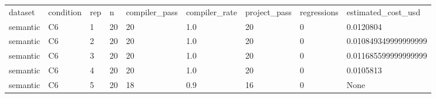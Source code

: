 \begin{tabular}{lllllllll}
dataset & condition & rep & n & compiler\_pass & compiler\_rate & project\_pass & regressions & estimated\_cost\_usd \\
semantic & C6 & 1 & 20 & 20 & 1.0 & 20 & 0 & 0.0120804 \\
semantic & C6 & 2 & 20 & 20 & 1.0 & 20 & 0 & 0.010849349999999999 \\
semantic & C6 & 3 & 20 & 20 & 1.0 & 20 & 0 & 0.011685599999999999 \\
semantic & C6 & 4 & 20 & 20 & 1.0 & 20 & 0 & 0.0105813 \\
semantic & C6 & 5 & 20 & 18 & 0.9 & 16 & 0 & None \\
\end{tabular}